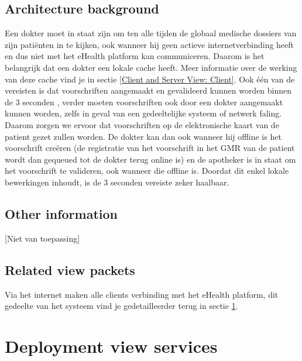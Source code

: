 \documentclass[a4paper,10pt]{article}
\begin{document}
\subsection{Architecture background}
Een dokter moet in staat zijn om ten alle tijden de globaal medische dossiers van zijn patiënten in te kijken, ook wanneer hij geen actieve internetverbinding heeft en dus niet met het eHealth platform kan communiceren. Daarom is het belangrijk dat een dokter een lokale cache heeft. Meer informatie over de werking van deze cache vind je in sectie \ref{Client and Server View: Client}.
Ook één van de vereisten is dat voorschriften aangemaakt en gevalideerd kunnen worden binnen de 3 seconden , verder moeten voorschriften ook door een dokter aangemaakt kunnen worden, zelfs in geval van een gedeeltelijke systeem of netwerk faling. Daarom zorgen we ervoor dat voorschriften op de elektronische kaart van de patient gezet zullen worden. De dokter kan dan ook wanneer hij offline is het voorschrift creëren (de registratie van het voorschrift in het GMR van de patient wordt dan gequeued tot de dokter terug online is) en de apotheker is in staat om het voorschrift te valideren, ook wanneer die offline is. Doordat dit enkel lokale bewerkingen inhoudt, is de 3 seconden vereiste zeker haalbaar.

\subsection{Other information}
[Niet van toepassing]

\subsection{Related view packets}
Via het internet maken alle clients verbinding met het eHealth platform, dit gedeelte van het systeem vind je gedetailleerder terug in sectie \ref{sec:deployment_services}.

\clearpage
\section{Deployment view services}
\label{sec:deployment_services}
\end{document}
